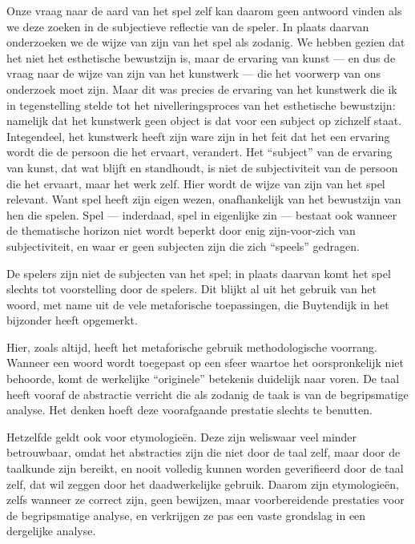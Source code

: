 Onze vraag naar de aard van het spel zelf kan daarom geen antwoord vinden als we deze zoeken in de subjectieve reflectie van de speler. In plaats daarvan onderzoeken we de wijze van zijn van het spel als zodanig. We hebben gezien dat het niet het esthetische bewustzijn is, maar de ervaring van kunst — en dus de vraag naar de wijze van zijn van het kunstwerk — die het voorwerp van ons onderzoek moet zijn. Maar dit was precies de ervaring van het kunstwerk die ik in tegenstelling stelde tot het nivelleringsproces van het esthetische bewustzijn: namelijk dat het kunstwerk geen object is dat voor een subject op zichzelf staat. Integendeel, het kunstwerk heeft zijn ware zijn in het feit dat het een ervaring wordt die de persoon die het ervaart, verandert. Het ``subject'' van de ervaring van kunst, dat wat blijft en standhoudt, is niet de subjectiviteit van de persoon die het ervaart, maar het werk zelf. Hier wordt de wijze van zijn van het spel relevant. Want spel heeft zijn eigen wezen, onafhankelijk van het bewustzijn van hen die spelen. Spel — inderdaad, spel in eigenlijke zin — bestaat ook wanneer de thematische horizon niet wordt beperkt door enig zijn-voor-zich van subjectiviteit, en waar er geen subjecten zijn die zich ``speels'' gedragen.

De spelers zijn niet de subjecten van het spel; in plaats daarvan komt het spel slechts tot voorstelling door de spelers. Dit blijkt al uit het gebruik van het woord, met name uit de vele metaforische toepassingen, die Buytendijk in het bijzonder heeft opgemerkt.

Hier, zoals altijd, heeft het metaforische gebruik methodologische voorrang. Wanneer een woord wordt toegepast op een sfeer waartoe het oorspronkelijk niet behoorde, komt de werkelijke ``originele'' betekenis duidelijk naar voren. De taal heeft vooraf de abstractie verricht die als zodanig de taak is van de begripsmatige analyse. Het denken hoeft deze voorafgaande prestatie slechts te benutten.

Hetzelfde geldt ook voor etymologieën. Deze zijn weliswaar veel minder betrouwbaar, omdat het abstracties zijn die niet door de taal zelf, maar door de taalkunde zijn bereikt, en nooit volledig kunnen worden geverifieerd door de taal zelf, dat wil zeggen door het daadwerkelijke gebruik. Daarom zijn etymologieën, zelfs wanneer ze correct zijn, geen bewijzen, maar voorbereidende prestaties voor de begripsmatige analyse, en verkrijgen ze pas een vaste grondslag in een dergelijke analyse.


